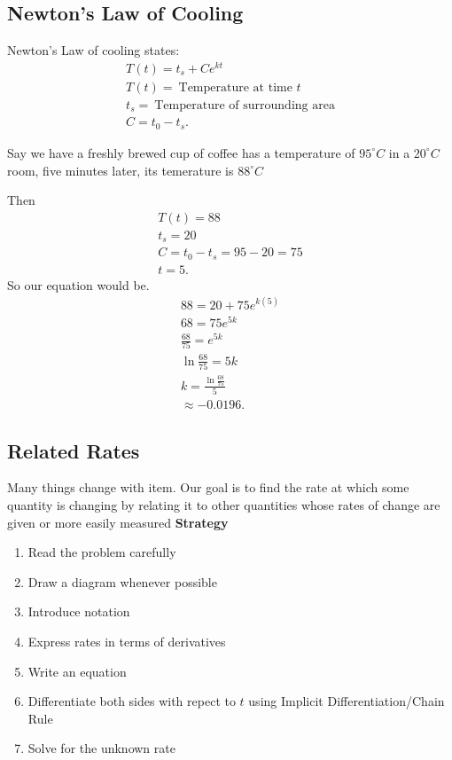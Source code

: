 \documentclass{report}
\begin{document}
    \pagebreak \bigbreak \noindent
    \subsection{Newton's Law of Cooling}
    \bigbreak \noindent \bigbreak \noindent
    Newton's Law of cooling states:
    \begin{align*}
      T(t) = t_{s} + Ce^{kt} \\
      T(t) =\ \text{Temperature at time $t$} \\
      t_{s} =\ \text{Temperature of surrounding area} \\
      C = t_{0} - t_{s}
    .\end{align*}

    \bigbreak \noindent \bigbreak \noindent
    Say we have a freshly brewed cup of coffee has a temperature of $95^{\circ}C$ in a $20^{\circ}C$ room, five minutes
    later, its temerature is $88^{\circ}C$

    \bigbreak \noindent \bigbreak \noindent
    Then
    \begin{align*}
      T(t) = 88 \\
      t_{s} = 20 \\
      C = t_{0} - t_{s} = 95 - 20  = 75 \\
      t = 5
    .\end{align*}
    \bigbreak \noindent \bigbreak \noindent
    So our equation would be.
    \begin{align*}
      88 = 20 + 75e^{k(5)} \\
      68 = 75e^{5k} \\
      \frac{68}{75} = e^{5k} \\
      \ln{\frac{68}{75}} = 5k \\
      k = \frac{\ln{\frac{68}{75}}}{5} \\
      \approx  - 0.0196
    .\end{align*}

    \pagebreak \bigbreak \noindent
    \subsection{Related Rates}
      \bigbreak \noindent 
    Many things change with item. Our goal is to find the rate at which some 
    quantity is changing by relating it to other quantities whose rates of 
    change are given or more easily measured 
    \bigbreak \noindent 
    \textbf{Strategy}
    \begin{enumerate}
      \item Read the problem carefully
      \item Draw a diagram whenever possible
      \item Introduce notation
      \item Express rates in terms of derivatives
      \item Write an equation 
      \item Differentiate both sides with repect to $t$ using Implicit Differentiation/Chain Rule
      \item Solve for the unknown rate
    \end{enumerate}
\end{document}
